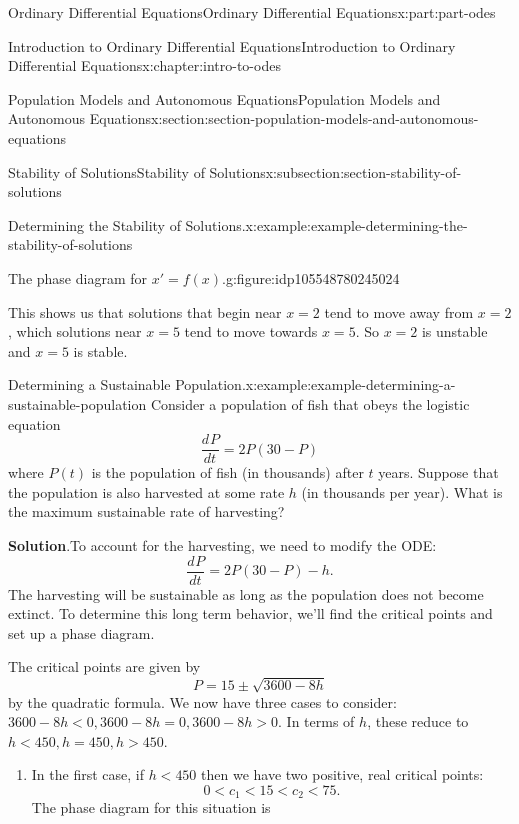 \documentclass[oneside,10pt,]{book}
\newcommand{\blocktitlefont}{\relax}
\numberwithin{equation}{part}
\newcommand{\dv}[3][]{\dfrac{d^{#1} #2}{d #3^{#1}}}
\newcommand{\lt}{<}
\newcommand{\gt}{>}
\begin{document}
\begin{partptx}{Ordinary Differential Equations}{}{Ordinary Differential Equations}{}{}{x:part:part-odes}
\begin{chapterptx}{Introduction to Ordinary Differential Equations}{}{Introduction to Ordinary Differential Equations}{}{}{x:chapter:intro-to-odes}
\begin{sectionptx}{Population Models and Autonomous Equations}{}{Population Models and Autonomous Equations}{}{}{x:section:section-population-models-and-autonomous-equations}
\begin{subsectionptx}{Stability of Solutions}{}{Stability of Solutions}{}{}{x:subsection:section-stability-of-solutions}
\begin{example}{Determining the Stability of Solutions.}{x:example:example-determining-the-stability-of-solutions}
\begin{figureptx}{The phase diagram for \(x' = f(x).\)}{g:figure:idp105548780245024}{}
\begin{image}{0.25}{0.5}{0.25}
{
}%
\end{image}%
\tcblower
\end{figureptx}%
This shows us that solutions that begin near \(x = 2\) tend to move away from \(x = 2\), which solutions near \(x = 5\) tend to move towards \(x = 5\). So \(x = 2\) is unstable and \(x = 5\) is stable.%
\end{example}
\begin{example}{Determining a Sustainable Population.}{x:example:example-determining-a-sustainable-population}%
Consider a population of fish that obeys the logistic equation%
\begin{equation*}
\dv{P}{t} = 2P(30 - P)
\end{equation*}
where \(P(t)\) is the population of fish (in thousands) after \(t\) years. Suppose that the population is also harvested at some rate \(h\) (in thousands per year). What is the maximum sustainable rate of harvesting?%
\par\smallskip%
\noindent\textbf{\blocktitlefont Solution}.\hypertarget{g:solution:idp105548780185888}{}\quad{}To account for the harvesting, we need to modify the ODE:%
\begin{equation*}
\dv{P}{t} = 2P(30 - P) - h.
\end{equation*}
The harvesting will be sustainable as long as the population does not become extinct. To determine this long term behavior, we'll find the critical points and set up a phase diagram.%
\par
The critical points are given by%
\begin{equation*}
P = 15 \pm \sqrt{3600 - 8h}
\end{equation*}
by the quadratic formula. We now have three cases to consider: \(3600 - 8h \lt 0, 3600 - 8h = 0, 3600 - 8h \gt 0.\) In terms of \(h\), these reduce to \(h \lt 450, h = 450, h \gt 450\).%
%
\begin{enumerate}
\item{}In the first case, if \(h \lt 450\) then we have two positive, real critical points:%
\begin{equation*}
0 \lt c_{1} \lt 15 \lt c_{2} \lt 75.
\end{equation*}
The phase diagram for this situation is%

\end{enumerate}
\end{example}
\end{subsectionptx}
\end{sectionptx}
\end{chapterptx}
\end{partptx}
\end{document}
